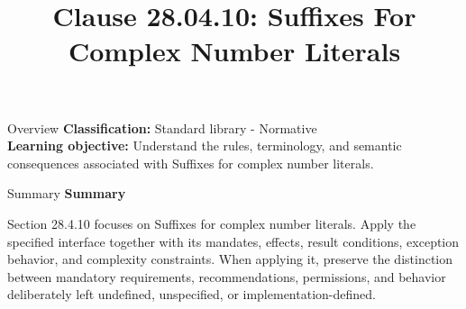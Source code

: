 \documentclass[10pt,letterpaper]{article}
\title{Clause 28.04.10: Suffixes For Complex Number Literals}
\author{}
\date{}
\begin{document}
\maketitle
\begin{CornellOverviewBox}{Overview}
\textbf{Classification:} Standard library - Normative\\[2pt]
\textbf{Learning objective:} Understand the rules, terminology, and semantic consequences associated with Suffixes for complex number literals.
\end{CornellOverviewBox}\begin{CornellSummaryBox}{Summary}
{\sffamily\bfseries\color{Accent} Summary}\par\vspace{3pt}Section 28.4.10 focuses on Suffixes for complex number literals. Apply the specified interface together with its mandates, effects, result conditions, exception behavior, and complexity constraints. When applying it, preserve the distinction between mandatory requirements, recommendations, permissions, and behavior deliberately left undefined, unspecified, or implementation-defined.
\end{CornellSummaryBox}
\end{document}
